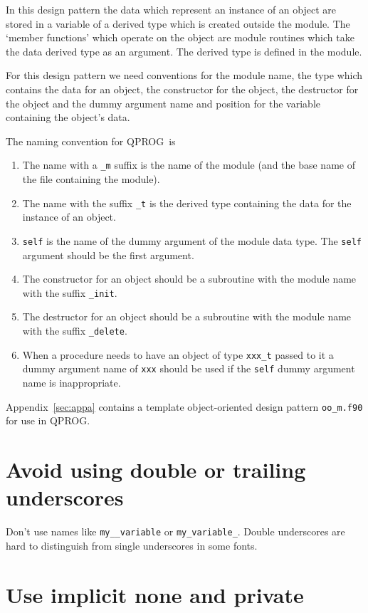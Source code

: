 \documentclass[11pt,twoside,a4paper]{report}
\def\coden{QPROG} %
\begin{document}
In this design pattern the data which represent an instance of an
object are stored in a variable of a derived type which is created
outside the module. The `member functions' which operate on the
object are module routines which take the data derived type 
as an argument. The derived type is defined in the module.

For this design pattern we need conventions for the module name,
the type which contains the data for an object, the constructor
for the object, the destructor for the object and the dummy argument
name and position for the variable containing the object's data.

The naming convention for \coden\ is 
\begin{enumerate}
\item The name with a \verb|_m| suffix is the name of the
  module (and the base name of the file containing the module).
\item The name with the suffix \verb|_t| is the derived type
  containing the data for the instance of an object.
\item \verb|self| is the name of the dummy argument of the
  module data type. The \verb|self| argument should be the
  first argument.
\item The constructor for an object should
  be a subroutine with the module name with the suffix \verb|_init|.
\item The destructor for an object should be a subroutine with the
  module name with the suffix \verb|_delete|.
\item When a procedure needs to have an object of
  type \verb|xxx_t| passed to it a dummy argument name of \verb|xxx|
  should be used if the \verb|self| dummy argument name is
  inappropriate.
\end{enumerate}
Appendix~\ref{sec:appa} contains a template object-oriented design
pattern \texttt{oo\_m.f90} for use in \coden.

\section{Avoid using double or trailing underscores}

Don't use names like \verb|my__variable| or \verb|my_variable_|.
Double underscores are hard to distinguish from single underscores
in some fonts.

\section{Use implicit none and private}
\end{document}
